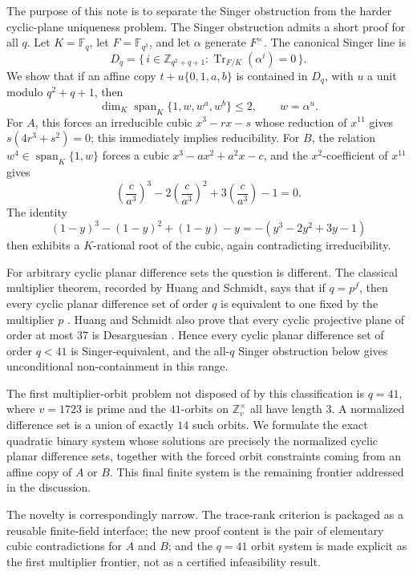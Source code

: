 \documentclass[11pt,letterpaper]{amsart}
\theoremstyle{plain}
\newcommand{\F}{\mathbb F}
\newcommand{\Z}{\mathbb Z}
\newcommand{\Tr}{\operatorname{Tr}}
\newcommand{\Span}{\operatorname{span}}
\begin{document}
The purpose of this note is to separate the Singer obstruction from the
harder cyclic-plane uniqueness problem.  The Singer obstruction admits a
short proof for all \(q\).  Let \(K=\F_q\), let \(F=\F_{q^3}\), and let
\(\alpha\) generate \(F^\times\).  The canonical Singer line is
\[
 D_q=\{\,i\in \Z_{q^2+q+1}:\Tr_{F/K}(\alpha^i)=0\,\}.
\]
We show that if an affine copy \(t+u\{0,1,a,b\}\) is contained in
\(D_q\), with \(u\) a unit modulo \(q^2+q+1\), then
\[
 \dim_K\Span_K\{1,w,w^a,w^b\}\leq 2,\qquad w=\alpha^u.
\]
For \(A\), this forces an irreducible cubic \(x^3-rx-s\) whose
reduction of \(x^{11}\) gives \(s(4r^3+s^2)=0\); this immediately
implies reducibility.  For \(B\), the relation \(w^4\in\Span_K\{1,w\}\)
forces a cubic \(x^3-ax^2+a^2x-c\), and the \(x^2\)-coefficient of
\(x^{11}\) gives
\[
 \left(\frac{c}{a^3}\right)^3
 -2\left(\frac{c}{a^3}\right)^2
 +3\left(\frac{c}{a^3}\right)-1=0.
\]
The identity
\[
 (1-y)^3-(1-y)^2+(1-y)-y
 =-(y^3-2y^2+3y-1)
\]
then exhibits a \(K\)-rational root of the cubic, again contradicting
irreducibility.

For arbitrary cyclic planar difference sets the question is different.
The classical multiplier theorem, recorded by Huang and Schmidt, says
that if \(q=p^f\), then every cyclic planar difference set of order
\(q\) is equivalent to one fixed by the multiplier \(p\)
\cite[Result 4]{HuangSchmidt}.  Huang and Schmidt also prove that every
cyclic projective plane of order at most \(37\) is Desarguesian
\cite[Theorem 28]{HuangSchmidt}.  Hence every cyclic planar difference
set of order \(q<41\) is Singer-equivalent, and the all-\(q\) Singer
obstruction below gives unconditional non-containment in this range.

The first multiplier-orbit problem not disposed of by this classification
is \(q=41\), where \(v=1723\) is prime and the \(41\)-orbits on
\(\Z_v^\times\) all have length \(3\).  A normalized difference set is a
union of exactly \(14\) such orbits.  We formulate the exact quadratic
binary system whose solutions are precisely the normalized cyclic planar
difference sets, together with the forced orbit constraints coming from
an affine copy of \(A\) or \(B\).  This final finite system is the
remaining frontier addressed in the discussion.

The novelty is correspondingly narrow.  The trace-rank criterion is
packaged as a reusable finite-field interface; the new proof content is
the pair of elementary cubic contradictions for \(A\) and \(B\); and the
\(q=41\) orbit system is made explicit as the first multiplier frontier,
not as a certified infeasibility result.
\end{document}
